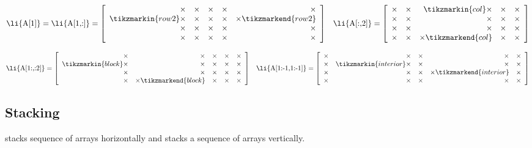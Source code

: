 \begin{align*}
\text{\li{A[1]}} = \text{\li{A[1,:]}} = \left[\begin{array}{rrrrr}
\times & \times & \times & \times & \times\\
\tikzmarkin{row2}\times & \times & \times & \times & \times\tikzmarkend{row2}\\
\times & \times & \times & \times & \times\\
\times & \times & \times & \times & \times\\
\end{array}\right]
&&
\text{\li{A[:,2]}} = \left[\begin{array}{rrrrr}
\times & \times & \tikzmarkin{col}\times & \times & \times\\
\times & \times & \times & \times & \times\\
\times & \times & \times & \times & \times\\
\times & \times & \times\tikzmarkend{col} & \times & \times
\end{array}\right]
\end{align*}

\begin{align*}
\text{\li{A[1:,:2]}} = \left[\begin{array}{rrrrr}
\times & \times & \times & \times & \times\\
\tikzmarkin{block}\times & \times & \times & \times & \times\\
\times & \times & \times & \times & \times\\
\times & \times\tikzmarkend{block} & \times & \times & \times
\end{array}\right]
&&
\text{\li{A[1:-1,1:-1]}} = \left[\begin{array}{rrrrr}
\times & \times & \times & \times & \times\\
\times & \tikzmarkin{interior} \times & \times & \times & \times\\
\times & \times & \times & \times \tikzmarkend{interior} & \times\\
\times & \times & \times & \times & \times\end{array}\right]
\end{align*}

\subsection*{Stacking}

 stacks sequence of arrays horizontally and  stacks a sequence of arrays vertically.

